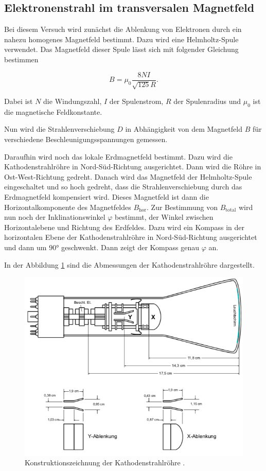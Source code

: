 \subsection{Elektronenstrahl im transversalen Magnetfeld}

Bei diesem Versuch wird zunächst die Ablenkung von Elektronen durch ein nahezu homogenes
Magnetfeld bestimmt. Dazu wird eine Helmholtz-Spule verwendet. Das Magnetfeld dieser
Spule lässt sich mit folgender Gleichung bestimmen

\begin{equation}
  B = \mu_0 \frac{8 N I}{\sqrt{125} R}.
  \label{eq:4}
\end{equation}

Dabei ist $N$ die Windungszahl, $I$ der Spulenstrom, $R$ der Spulenradius und
$\mu_0$ ist die magnetische Feldkonstante.

Nun wird die Strahlenverschiebung $D$ in Abhängigkeit von dem Magnetfeld $B$ für verschiedene
Beschleunigungsspannungen gemessen.

Daraufhin wird noch das lokale Erdmagnetfeld bestimmt. Dazu wird die Kathodenstrahlröhre
in Nord-Süd-Richtung ausgerichtet. Dann wird die Röhre in Ost-West-Richtung gedreht.
Danach wird das Magnetfeld der Helmholtz-Spule eingeschaltet und so hoch gedreht, dass
die Strahlenverschiebung durch das Erdmagnetfeld kompensiert wird. Dieses Magnetfeld ist dann
die Horizontalkomponente des Magnetfeldes $B_\text{hor}$.
Zur Bestimmung von $B_\text{total}$ wird nun noch der Inklinationswinkel $\varphi$
bestimmt, der Winkel zwischen Horizontalebene und Richtung des Erdfeldes. Dazu wird
ein Kompass in der horizontalen Ebene der Kathodenstrahlröhre in Nord-Süd-Richtung ausgerichtet
und dann um $90°$ geschwenkt. Dann zeigt der Kompass genau $\varphi$ an.


In der Abbildung \ref{abb:5} sind die Abmessungen der Kathodenstrahlröhre dargestellt.

\begin{figure}[H]
  \centering
  \includegraphics[width=\textwidth]{content/Roehre.png}
  \caption{Konstruktionszeichnung der Kathodenstrahlröhre \cite{1}.}
  \label{abb:5}
\end{figure}
